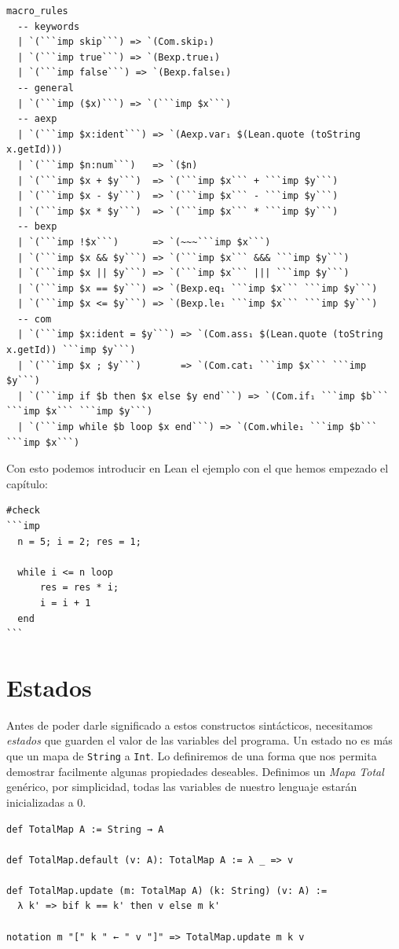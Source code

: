 \documentclass[../main.tex]{subfiles}
\begin{document}
\begin{verbatim}
macro_rules
  -- keywords
  | `(```imp skip```) => `(Com.skip₁)
  | `(```imp true```) => `(Bexp.true₁)
  | `(```imp false```) => `(Bexp.false₁)
  -- general
  | `(```imp ($x)```) => `(```imp $x```)
  -- aexp
  | `(```imp $x:ident```) => `(Aexp.var₁ $(Lean.quote (toString x.getId)))
  | `(```imp $n:num```)   => `($n)
  | `(```imp $x + $y```)  => `(```imp $x``` + ```imp $y```)
  | `(```imp $x - $y```)  => `(```imp $x``` - ```imp $y```)
  | `(```imp $x * $y```)  => `(```imp $x``` * ```imp $y```)
  -- bexp
  | `(```imp !$x```)      => `(~~~```imp $x```)
  | `(```imp $x && $y```) => `(```imp $x``` &&& ```imp $y```)
  | `(```imp $x || $y```) => `(```imp $x``` ||| ```imp $y```)
  | `(```imp $x == $y```) => `(Bexp.eq₁ ```imp $x``` ```imp $y```)
  | `(```imp $x <= $y```) => `(Bexp.le₁ ```imp $x``` ```imp $y```)
  -- com
  | `(```imp $x:ident = $y```) => `(Com.ass₁ $(Lean.quote (toString x.getId)) ```imp $y```)
  | `(```imp $x ; $y```)       => `(Com.cat₁ ```imp $x``` ```imp $y```)
  | `(```imp if $b then $x else $y end```) => `(Com.if₁ ```imp $b``` ```imp $x``` ```imp $y```)
  | `(```imp while $b loop $x end```) => `(Com.while₁ ```imp $b``` ```imp $x```)
\end{verbatim}

Con esto podemos introducir en Lean el ejemplo con el que hemos empezado el
capítulo:

\begin{verbatim}
#check
```imp
  n = 5; i = 2; res = 1;

  while i <= n loop
      res = res * i;
      i = i + 1
  end
```
\end{verbatim}

\section{Estados}

Antes de poder darle significado a estos constructos sintácticos, necesitamos
\emph{estados} que guarden el valor de las variables del programa. Un estado
no es más que un mapa de \texttt{String} a \texttt{Int}. Lo definiremos
de una forma que nos permita demostrar facilmente algunas propiedades deseables.
Definimos un \emph{Mapa Total} genérico, por simplicidad, todas las variables
de nuestro lenguaje estarán inicializadas a 0.

\begin{verbatim}
def TotalMap A := String → A

def TotalMap.default (v: A): TotalMap A := λ _ => v

def TotalMap.update (m: TotalMap A) (k: String) (v: A) :=
  λ k' => bif k == k' then v else m k'

notation m "[" k " ← " v "]" => TotalMap.update m k v
\end{verbatim}
\end{document}
